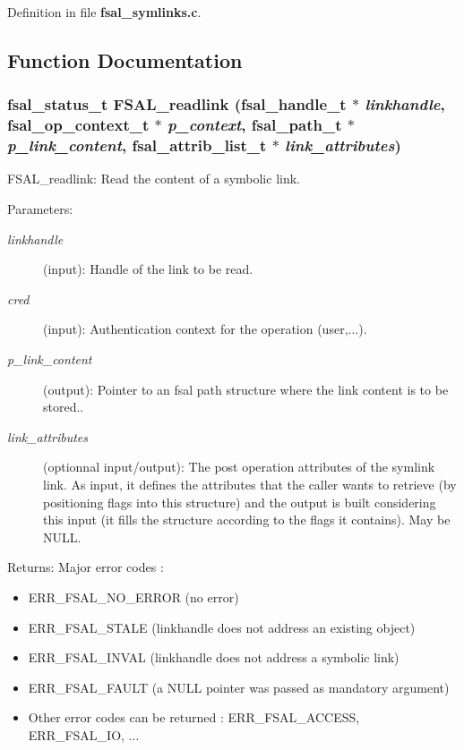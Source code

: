 Definition in file {\bf fsal\_\-symlinks.c}.

\subsection{Function Documentation}
\subsubsection{\setlength{\rightskip}{0pt plus 5cm}fsal\_\-status\_\-t FSAL\_\-readlink (fsal\_\-handle\_\-t $\ast$ {\em linkhandle}, fsal\_\-op\_\-context\_\-t $\ast$ {\em p\_\-context}, fsal\_\-path\_\-t $\ast$ {\em p\_\-link\_\-content}, fsal\_\-attrib\_\-list\_\-t $\ast$ {\em link\_\-attributes})}\label{fsal__symlinks_8c_a0}


FSAL\_\-readlink: Read the content of a symbolic link.

\begin{Desc}
\item[Parameters:]
\begin{description}
\item[{\em linkhandle}](input): Handle of the link to be read. \item[{\em cred}](input): Authentication context for the operation (user,...). \item[{\em p\_\-link\_\-content}](output): Pointer to an fsal path structure where the link content is to be stored.. \item[{\em link\_\-attributes}](optionnal input/output): The post operation attributes of the symlink link. As input, it defines the attributes that the caller wants to retrieve (by positioning flags into this structure) and the output is built considering this input (it fills the structure according to the flags it contains). May be NULL.\end{description}
\end{Desc}
\begin{Desc}
\item[Returns:]Major error codes :\begin{itemize}
\item ERR\_\-FSAL\_\-NO\_\-ERROR (no error)\item ERR\_\-FSAL\_\-STALE (linkhandle does not address an existing object)\item ERR\_\-FSAL\_\-INVAL (linkhandle does not address a symbolic link)\item ERR\_\-FSAL\_\-FAULT (a NULL pointer was passed as mandatory argument)\item Other error codes can be returned : ERR\_\-FSAL\_\-ACCESS, ERR\_\-FSAL\_\-IO, ... \end{itemize}
\end{Desc}



